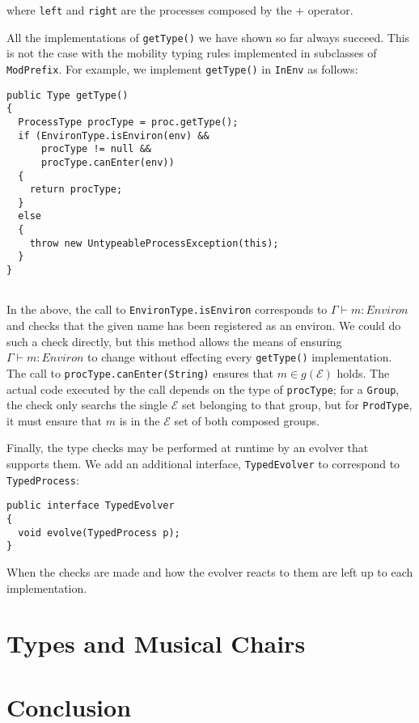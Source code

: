 \noindent where \texttt{left} and \texttt{right} are the processes
composed by the $+$ operator.

All the implementations of \texttt{getType()} we have shown so far
always succeed.  This is not the case with the mobility typing rules
implemented in subclasses of \texttt{ModPrefix}.  For example, we
implement \texttt{getType()} in \texttt{InEnv} as follows:

\begin{verbatim}
public Type getType()
{
  ProcessType procType = proc.getType();  
  if (EnvironType.isEnviron(env) &&
      procType != null &&
      procType.canEnter(env))
  {
    return procType;
  }
  else
  {
    throw new UntypeableProcessException(this);
  }
}
 
\end{verbatim}

\noindent In the above, the call to \texttt{EnvironType.isEnviron}
corresponds to $\Gamma \vdash m : Environ$ and checks that the given
name has been registered as an environ.  We could do such a check
directly, but this method allows the means of ensuring $\Gamma \vdash
m : Environ$ to change without effecting every \texttt{getType()}
implementation.  The call to \texttt{procType.canEnter(String)}
ensures that $m \in g(\mathscr{E})$ holds.  The actual code executed
by the call depends on the type of \texttt{procType}; for a
\texttt{Group}, the check only searchs the single $\mathcal{E}$ set
belonging to that group, but for \texttt{ProdType}, it must ensure
that $m$ is in the $\mathcal{E}$ set of both composed groups.

Finally, the type checks may be performed at runtime by an evolver
that supports them.  We add an additional interface,
\texttt{TypedEvolver} to correspond to \texttt{TypedProcess}:

\begin{verbatim}
public interface TypedEvolver
{
  void evolve(TypedProcess p);
}
\end{verbatim}

\noindent When the checks are made and how the evolver reacts to them
are left up to each implementation.

\section{Types and Musical Chairs}

\section{Conclusion}

